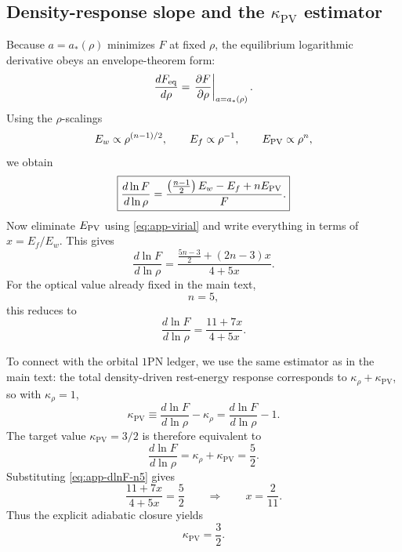 \documentclass[11pt]{article}
\newcommand{\kPV}{\kappa_{\mathrm{PV}}}
\newcommand{\krho}{\kappa_{\rho}}
\begin{document}
\subsection{Density-response slope and the \texorpdfstring{$\kPV$}{kappaPV} estimator}
\label{app:adiabatic-slope}

Because \(a=a_*(\rho)\) minimizes \(F\) at fixed \(\rho\), the equilibrium logarithmic
derivative obeys an envelope-theorem form:
\begin{equation}
\frac{dF_{\rm eq}}{d\rho}
=
\left.\frac{\partial F}{\partial \rho}\right|_{a=a_*(\rho)}.
\label{eq:app-envelope}
\end{equation}
Using the \(\rho\)-scalings
\begin{equation}
E_w\propto \rho^{(n-1)/2},
\qquad
E_f\propto \rho^{-1},
\qquad
E_{\rm PV}\propto \rho^n,
\label{eq:app-rho-scalings}
\end{equation}
we obtain
\begin{equation}
\boxed{
\frac{d\ln F}{d\ln \rho}
=
\frac{\left(\frac{n-1}{2}\right)E_w - E_f + nE_{\rm PV}}{F}.
}
\label{eq:app-dlnF-general}
\end{equation}
Now eliminate \(E_{\rm PV}\) using \eqref{eq:app-virial} and write everything in terms of
\(x=E_f/E_w\). This gives
\begin{equation}
\boxed{
\frac{d\ln F}{d\ln\rho}
=
\frac{\frac{5n-3}{2}+(2n-3)x}{4+5x}.
}
\label{eq:app-dlnF-in-x}
\end{equation}
For the optical value already fixed in the main text,
\begin{equation}
n=5,
\label{eq:app-n-five}
\end{equation}
this reduces to
\begin{equation}
\boxed{
\frac{d\ln F}{d\ln\rho}
=
\frac{11+7x}{4+5x}.
}
\label{eq:app-dlnF-n5}
\end{equation}

To connect with the orbital \(1\)PN ledger, we use the same estimator as in the main text:
the total density-driven rest-energy response corresponds to
\(\krho+\kPV\), so with \(\krho=1\),
\begin{equation}
\kPV
\equiv
\frac{d\ln F}{d\ln\rho}
-
\krho
=
\frac{d\ln F}{d\ln\rho}-1.
\label{eq:app-kPV-estimator}
\end{equation}
The target value \(\kPV=3/2\) is therefore equivalent to
\begin{equation}
\frac{d\ln F}{d\ln\rho}
=
\krho+\kPV
=
\frac52.
\label{eq:app-target-slope}
\end{equation}
Substituting \eqref{eq:app-dlnF-n5} gives
\begin{equation}
\frac{11+7x}{4+5x}=\frac52
\qquad\Longrightarrow\qquad
\boxed{
x=\frac{2}{11}.
}
\label{eq:app-x-solution}
\end{equation}
Thus the explicit adiabatic closure yields
\begin{equation}
\boxed{
\kPV=\frac32.
}
\label{eq:app-kPV-solution}
\end{equation}
\end{document}
